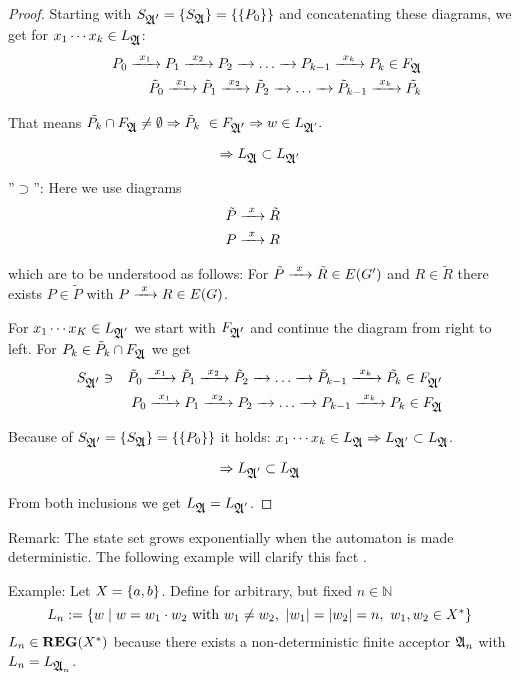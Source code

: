 \begin{proof}
Starting with $S_{\mbox{$\mathfrak{A'}$}} = \mbox{$\{S_{\mbox{$\mathfrak{A}$}}\}$} = \mbox{$\{\mbox{$\{P_0 \}$}\}$}$ and
concatenating these diagrams, we get for $x_1 \cdots x_k \in
L_{\mbox{$\mathfrak{A}$}}$:
\begin{eqnarray*}
 & & P_0 \xrightarrow{\ {x_1}\ } P_1 \xrightarrow{\ {x_2}\ } P_2 \xrightarrow{\ {}\ } \ldots \xrightarrow{\ {}\ } P_{k-1} \xrightarrow{\ {x_k}\ }
 P_k \in F_{\mbox{$\mathfrak{A}$}} \\
 & & \tilde{P}_0 \xrightarrow{\ {x_1}\ } \tilde{P}_1 \xrightarrow{\ {x_2}\ } \tilde{P}_2 \xrightarrow{\ {}\ } \ldots
 \xrightarrow{\ {}\ } \tilde{P}_{k-1} \xrightarrow{\ {x_k}\ } \tilde{P_k}
\end{eqnarray*}

That means $\tilde{P_k} \cap F_{\mbox{$\mathfrak{A}$}} \neq \emptyset \Rightarrow \tilde{P}_k \
\in F_{\mbox{$\mathfrak{A'}$}} \Rightarrow w \in L_{\mbox{$\mathfrak{A}$}'}.$

\[ \Rightarrow L_{\mbox{$\mathfrak{A}$}} \subset L_{\mbox{$\mathfrak{A}$}'}\]

''$\supset$'': Here we use diagrams  
\begin{eqnarray*}
& \tilde{P} \xrightarrow{\ {x}\ } \tilde{R} & \\
& P \xrightarrow{\ {x}\ } R & 
\end{eqnarray*}

which are to be understood as follows: For $\tilde{P} \xrightarrow{\ {x}\ } \tilde{R} \in
E(G')$ and $R \in \tilde{R}$ there exists $P \in \tilde{P}$ with $P \xrightarrow{\ {x}\ } R
\in E(G)$.

For $x_1 \cdots x_K \in L_{\mbox{$\mathfrak{A}$}'}$ we start with $F_{\mbox{$\mathfrak{A'}$}}$ and continue
the diagram from right to left. For $P_k \in \tilde{P}_k \cap F_{\mbox{$\mathfrak{A}$}}$ we get
\begin{eqnarray*}
 & S_{\mbox{$\mathfrak{A'}$}} \ni & \tilde{P}_0 \xrightarrow{\ {x_1}\ } \tilde{P}_1 \xrightarrow{\ {x_2}\ } \tilde{P}_2 \xrightarrow{\ {}\ } \ldots
 \xrightarrow{\ {}\ } \tilde{P}_{k-1} \xrightarrow{\ {x_k}\ } \tilde{P_k} \in F_{\mbox{$\mathfrak{A'}$}} \\
 & & P_0 \xrightarrow{\ {x_1}\ } P_1 \xrightarrow{\ {x_2}\ } P_2 \xrightarrow{\ {}\ } \ldots \xrightarrow{\ {}\ }
 P_{k-1} \xrightarrow{\ {x_k}\ } P_k \in F_{\mbox{$\mathfrak{A}$}} 
\end{eqnarray*}

Because of $S_{\mbox{$\mathfrak{A'}$}} = \mbox{$\{S_{\mbox{$\mathfrak{A}$}}\}$} = \mbox{$\{\mbox{$\{P_0\}$}\}$}$ it holds:
$x_1 \cdots x_k \in L_{\mbox{$\mathfrak{A}$}} \Rightarrow L_{\mbox{$\mathfrak{A}$}'} \subset L_{\mbox{$\mathfrak{A}$}}$.

\[ \Rightarrow L_{\mbox{$\mathfrak{A}$}'} \subset L_{\mbox{$\mathfrak{A}$}}\]

From both inclusions we get $L_{\mbox{$\mathfrak{A}$}} = L_{\mbox{$\mathfrak{A}$}'}$.
\end{proof}

\bigskip
Remark: The state set grows exponentially when the automaton is made
deterministic. The following example will clarify this fact \cite{Commentz}.

\bigskip
Example: Let $X = \mbox{$\{a, b\}$}$. Define for arbitrary, but fixed $n \in
\mathbb{N}$ \[ L_n := \mbox{$\{w \mid w = w_1 \cdot w_2 \mbox{ with } w_1 \neq
w_2,\ |w_1| = |w_2| = n,\ w_1, w_2 \in X^*\}$} 
\]
$L_n \in \mbox{{\bf REG}}(X^*)$ because there exists a non-deterministic finite acceptor
$\mbox{$\mathfrak{A}$}_{n}$ with $L_n = L_{\mbox{$\mathfrak{A}$}_{n}}$.

